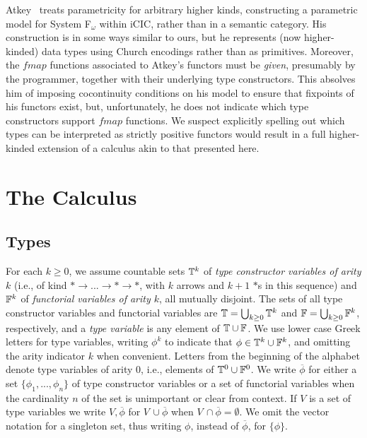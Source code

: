 \documentclass[runningheads]{llncs}
\begin{document}
Atkey~\cite{atk12} treats parametricity for arbitrary higher kinds,
constructing a parametric model for System F$_\omega$ within iCIC,
rather than in a semantic category. His construction is in some ways
similar to ours, but he represents (now higher-kinded) data types
using Church encodings rather than as primitives. Moreover, the
$\mathit{fmap}$ functions associated to Atkey's functors must be {\em
  given}, presumably by the programmer, together with their underlying
type constructors. This absolves him of imposing cocontinuity
conditions on his model to ensure that fixpoints of his functors
exist, but, unfortunately, he does not indicate which type
constructors support $\mathit{fmap}$ functions. We suspect explicitly
spelling out which types can be interpreted as strictly positive
functors would result in a full higher-kinded extension of a calculus
akin to that presented here.

\vspace*{-0.1in}

\section{The Calculus}\label{sec:calculus}

\vspace*{-0.1in}

\subsection{Types}

\vspace*{-0.1in}

For each $k \ge 0$, we assume countable sets $\mathbb{T}^k$ of \emph{type
  constructor variables of arity $k$} (i.e., of kind $\mathtt{* \to
  ... \to * \to *}$, with $k$ arrows and $k+1$ $*$s in this sequence)
and $\mathbb{F}^k$ of \emph{functorial variables of arity $k$}, all
mutually disjoint.  The sets of all type constructor variables and
functorial variables are $\mathbb{T} = \bigcup_{k \ge 0} \mathbb{T}^k$ and
$\mathbb{F} = \bigcup_{k \ge 0} \mathbb{F}^k$, respectively, and a \emph{type
  variable} is any element of $\mathbb{T} \cup \mathbb{F}$.  We use lower case
Greek letters for type variables, writing $\phi^k$ to indicate that
$\phi \in \mathbb{T}^k \cup \mathbb{F}^k$, and omitting the arity indicator
$k$ when convenient.  Letters from the beginning of the alphabet
denote type variables of arity $0$, i.e., elements of $\mathbb{T}^0 \cup
\mathbb{F}^0$. We write $\overline{\phi}$ for either a set
$\{\phi_1,...,\phi_n\}$ of type constructor variables or a set of
functorial variables when the cardinality $n$ of the set is
unimportant or clear from context. If $V$ is a set of type variables
we write $V, \overline{\phi}$ for $V\, \cup \overline{\phi}$ when $V\,
\cap \overline{\phi} = \emptyset$.  We omit the vector notation for a
singleton set, thus writing $\phi$, instead of $\overline{\phi}$, for
$\{\phi\}$.
\end{document}
